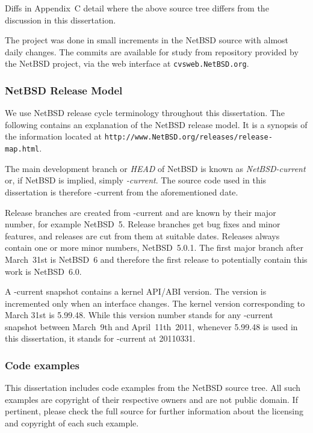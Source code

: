 Diffs in Appendix~C detail where the above source tree differs
from the discussion in this dissertation.

The project was done in small increments in the NetBSD source with
almost daily changes.  The commits are available for study from
repository provided by the NetBSD project, \eg via the web interface
at \texttt{cvsweb.NetBSD.org}.

\subsubsection*{NetBSD Release Model}

We use NetBSD release cycle terminology throughout this dissertation.
The following contains an explanation of the NetBSD release model.
It is a synopsis of the information located at
\texttt{http://www.NetBSD.org/releases/release-map.html}.

The main development branch or \textit{HEAD} of NetBSD is known as
\textit{NetBSD-current} or, if NetBSD is implied, simply
\textit{-current}.  The source code used in this dissertation is
therefore -current from the aforementioned date.

Release branches are created from -current and are known by their
major number, for example NetBSD~5.  Release branches get bug fixes
and minor features, and releases are cut from them at suitable
dates.  Releases always contain one or more minor numbers, \eg
NetBSD~5.0.1.  The first major branch after March~31st is NetBSD~6
and therefore the first release to potentially contain this work
is NetBSD~6.0.

A -current snapshot contains a kernel API/ABI version.  The version is
incremented only when an interface changes.  The kernel version
corresponding to March 31st is 5.99.48.  While this version number
stands for any -current snapshot between March~9th and April~11th~2011,
whenever 5.99.48 is used in this dissertation, it stands for -current
at 20110331.

\subsubsection*{Code examples}

This dissertation includes code examples from the NetBSD source
tree.  All such examples are copyright of their respective owners
and are not public domain.  If pertinent, please check the full
source for further information about the licensing and copyright
of each such example.


